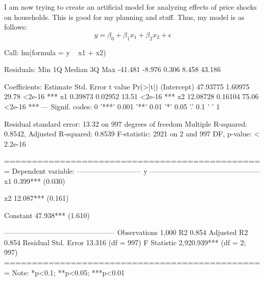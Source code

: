 \documentclass{article}
\begin{document}


I am now trying to create an artificial model for analyzing effects of price shocks on households. This is good for my planning and stuff. Thus, my model is as follows:
\begin{equation}
y = \beta_0 + \beta_1 x_1 + \beta_2 x_2 + \epsilon
\end{equation}
\begin{Schunk}
\begin{Soutput}
Call:
lm(formula = y ~ x1 + x2)

Residuals:
    Min      1Q  Median      3Q     Max 
-41.481  -8.976   0.306   8.458  43.186 

Coefficients:
            Estimate Std. Error t value Pr(>|t|)    
(Intercept) 47.93775    1.60975   29.78   <2e-16 ***
x1           0.39873    0.02952   13.51   <2e-16 ***
x2          12.08728    0.16104   75.06   <2e-16 ***
---
Signif. codes:  0 '***' 0.001 '**' 0.01 '*' 0.05 '.' 0.1 ' ' 1

Residual standard error: 13.32 on 997 degrees of freedom
Multiple R-squared:  0.8542,	Adjusted R-squared:  0.8539 
F-statistic:  2921 on 2 and 997 DF,  p-value: < 2.2e-16
\end{Soutput}
\begin{Soutput}
===============================================
                        Dependent variable:    
                    ---------------------------
                                 y             
-----------------------------------------------
x1                           0.399***          
                              (0.030)          
                                               
x2                           12.087***         
                              (0.161)          
                                               
Constant                     47.938***         
                              (1.610)          
                                               
-----------------------------------------------
Observations                   1,000           
R2                             0.854           
Adjusted R2                    0.854           
Residual Std. Error      13.316 (df = 997)     
F Statistic         2,920.939*** (df = 2; 997) 
===============================================
Note:               *p<0.1; **p<0.05; ***p<0.01
\end{Soutput}
\end{Schunk}
\end{document}
